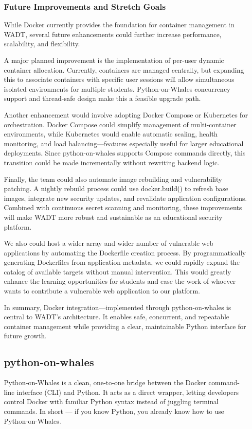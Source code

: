 \documentclass[12pt]{article}
\begin{document}
\subsubsection{Future Improvements and Stretch Goals}
While Docker currently provides the foundation for container management in WADT, several future enhancements could further increase performance, scalability, and flexibility.

A major planned improvement is the implementation of per-user dynamic container allocation. Currently, containers are managed centrally, but expanding this to associate containers with specific user sessions will allow simultaneous isolated environments for multiple students. Python-on-Whales concurrency support and thread-safe design make this a feasible upgrade path.

Another enhancement would involve adopting Docker Compose or Kubernetes for orchestration. Docker Compose could simplify management of multi-container environments, while Kubernetes would enable automatic scaling, health monitoring, and load balancing—features especially useful for larger educational deployments. Since python-on-whales supports Compose commands directly, this transition could be made incrementally without rewriting backend logic.

Finally, the team could also automate image rebuilding and vulnerability patching. A nightly rebuild process could use docker.build() to refresh base images, integrate new security updates, and revalidate application configurations. Combined with continuous secret scanning and monitoring, these improvements will make WADT more robust and sustainable as an educational security platform.

We also could host a wider array and wider number of vulnerable web applications by automating the Dockerfile creation process. By programmatically generating Dockerfiles from application metadata, we could rapidly expand the catalog of available targets without manual intervention. This would greatly enhance the learning opportunities for students and ease the work of whoever wants to contribute a vulnerable web application to our platform.

In summary, Docker integration—implemented through python-on-whales is central to WADT’s architecture. It enables safe, concurrent, and repeatable container management while providing a clear, maintainable Python interface for future growth.


\subsection{python-on-whales}
Python-on-Whales is a clean, one-to-one bridge between the Docker command-line interface (CLI) and Python. 
It acts as a direct wrapper, letting developers control Docker with familiar Python syntax instead of juggling terminal commands. 
In short — if you know Python, you already know how to use Python-on-Whales.
\end{document}
